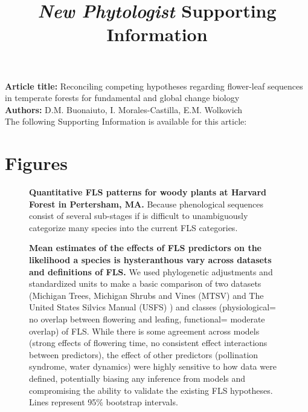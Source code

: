\documentclass[11pt]{article}\usepackage[]{graphicx}\usepackage[]{color}
\title{\textit{New Phytologist} Supporting Information}
\date{}
\begin{document}
\maketitle

\noindent \textbf{Article title:} Reconciling competing hypotheses regarding flower-leaf sequences in temperate forests for fundamental and global change biology\\
\noindent \textbf{Authors:} D.M. Buonaiuto, I. Morales-Castilla, E.M. Wolkovich\\

\noindent The following Supporting Information is available for this article:\\


\section*{Figures}


\begin{figure}[H]
    \centering
 
    \caption{\textbf{Quantitative FLS patterns for woody plants at Harvard Forest in Pertersham, MA.} Because phenological sequences consist of several sub-stages if is difficult to unambiguously categorize many species into the current FLS categories. }
    \label{fig:HFmeans}
\end{figure}

\begin{figure}[H]
    \centering

    \caption{\textbf{Mean estimates of the effects of FLS predictors on the likelihood a species is hysteranthous vary across datasets and definitions of FLS.}  We used phylogenetic adjustments and standardized units to make a basic comparison of two datasets (Michigan Trees, Michigan Shrubs and Vines (MTSV) \citep{Barnes2004,Barnes2016} and The United States Silvics Manual (USFS) \citep{Burns1990}) and classes (physiological= no overlap between flowering and leafing, functional= moderate overlap) of FLS. While there is some agreement across models (strong effects of flowering time, no consistent effect interactions between predictors), the effect of other predictors (pollination syndrome, water dynamics) were highly sensitive to how data were defined, potentially biasing any inference from models and compromising the ability to validate the existing FLS hypotheses. Lines represent 95\% bootstrap intervals.}
    \label{fig:muplots.USMT}
\end{figure}
\end{document}
